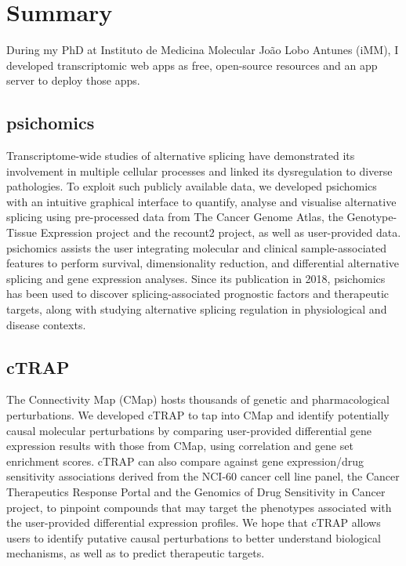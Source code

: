 \chapter*{Summary}

During my PhD at Instituto de Medicina Molecular João Lobo Antunes (iMM), I developed transcriptomic web apps as free, open-source resources and an app server to deploy those apps.

\section*{psichomics}

Transcriptome-wide studies of alternative splicing have demonstrated its involvement in multiple cellular processes and linked its dysregulation to diverse pathologies. To exploit such publicly available data, we developed psichomics with an intuitive graphical interface to quantify, analyse and visualise alternative splicing using pre-processed data from The Cancer Genome Atlas, the Genotype-Tissue Expression project and the recount2 project, as well as user-provided data. psichomics assists the user integrating molecular and clinical sample-associated features to perform survival, dimensionality reduction, and differential alternative splicing and gene expression analyses. Since its publication in 2018, psichomics has been used to discover splicing-associated prognostic factors and therapeutic targets, along with studying alternative splicing regulation in physiological and disease contexts.

\section*{cTRAP}

The Connectivity Map (CMap) hosts thousands of genetic and pharmacological perturbations. We developed cTRAP to tap into CMap and identify potentially causal molecular perturbations by comparing user-provided differential gene expression results with those from CMap, using correlation and gene set enrichment scores. cTRAP can also compare against gene expression/drug sensitivity associations derived from the NCI-60 cancer cell line panel, the Cancer Therapeutics Response Portal and the Genomics of Drug Sensitivity in Cancer project, to pinpoint compounds that may target the phenotypes associated with the user-provided differential expression profiles. We hope that cTRAP allows users to identify putative causal perturbations to better understand biological mechanisms, as well as to predict therapeutic targets.

